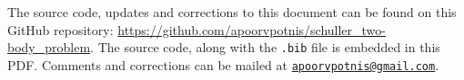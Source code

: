\documentclass[12pt, a4 paper]{article}
\theoremstyle{definition}
\begin{document}














%

	\nocite{*}
	\printbibliography[heading=bibintoc]

	\par\begin{spacing}{0.6}
		{\footnotesize The source code, updates and corrections to this document can be found on this GitHub repository: \url{https://github.com/apoorvpotnis/schuller_two-body_problem}. The source code, along with the \texttt{.bib} file is embedded in this PDF. Comments and corrections can be mailed at \href{mailto:apoorvpotnis@gmail.com}{\texttt{apoorvpotnis@gmail.com}}.}
	\end{spacing}
\end{document}
